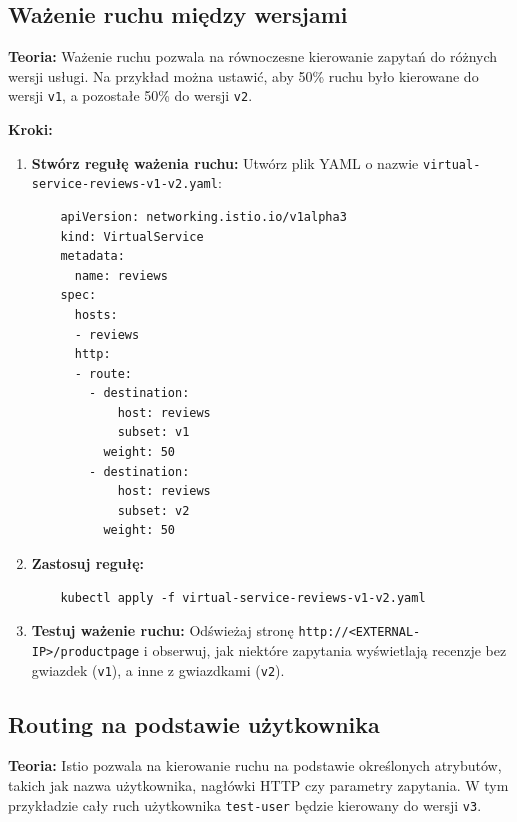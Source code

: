 \documentclass{article}
\begin{document}
\subsection{Ważenie ruchu między wersjami}

\textbf{Teoria:}
Ważenie ruchu pozwala na równoczesne kierowanie zapytań do różnych wersji usługi. Na przykład można ustawić, aby 50\% ruchu było kierowane do wersji \texttt{v1}, a pozostałe 50\% do wersji \texttt{v2}.

\textbf{Kroki:}
\begin{enumerate}
    \item \textbf{Stwórz regułę ważenia ruchu:}
    Utwórz plik YAML o nazwie \texttt{virtual-service-reviews-v1-v2.yaml}:
    \begin{lstlisting}
    apiVersion: networking.istio.io/v1alpha3
    kind: VirtualService
    metadata:
      name: reviews
    spec:
      hosts:
      - reviews
      http:
      - route:
        - destination:
            host: reviews
            subset: v1
          weight: 50
        - destination:
            host: reviews
            subset: v2
          weight: 50
    \end{lstlisting}

    \item \textbf{Zastosuj regułę:}
    \begin{lstlisting}
    kubectl apply -f virtual-service-reviews-v1-v2.yaml
    \end{lstlisting}

    \item \textbf{Testuj ważenie ruchu:}
    Odświeżaj stronę \texttt{http://<EXTERNAL-IP>/productpage} i obserwuj, jak niektóre zapytania wyświetlają recenzje bez gwiazdek (\texttt{v1}), a inne z gwiazdkami (\texttt{v2}).
\end{enumerate}

\subsection{Routing na podstawie użytkownika}

\textbf{Teoria:}
Istio pozwala na kierowanie ruchu na podstawie określonych atrybutów, takich jak nazwa użytkownika, nagłówki HTTP czy parametry zapytania. W tym przykładzie cały ruch użytkownika \texttt{test-user} będzie kierowany do wersji \texttt{v3}.
\end{document}
